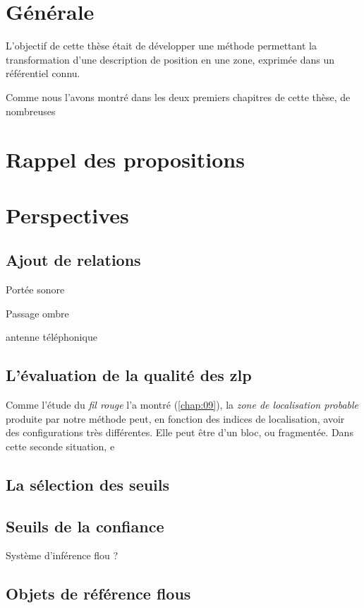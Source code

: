 \section{Générale}

L'objectif de cette thèse était de développer une méthode permettant
la transformation d'une description de position en une zone, exprimée
dans un référentiel connu.


Comme nous l'avons montré dans les deux premiers chapitres de cette
thèse, de nombreuses



\section{Rappel des propositions}

\section{Perspectives}

\subsection{Ajout de relations}

Portée sonore

Passage ombre

antenne téléphonique

\subsection{L'évaluation de la qualité des \ac{zlp}}

Comme l'étude du \emph{fil rouge} l'a montré (\autoref{chap:09}), la
\emph{zone de localisation probable} produite par notre méthode peut,
en fonction des indices de localisation, avoir des configurations très
différentes. Elle peut être d'un bloc, ou fragmentée. Dans cette
seconde situation,  e

\subsection{La sélection des seuils}

\subsection{Seuils de la confiance}

Système d'inférence flou ?

\subsection{Objets de référence flous}


